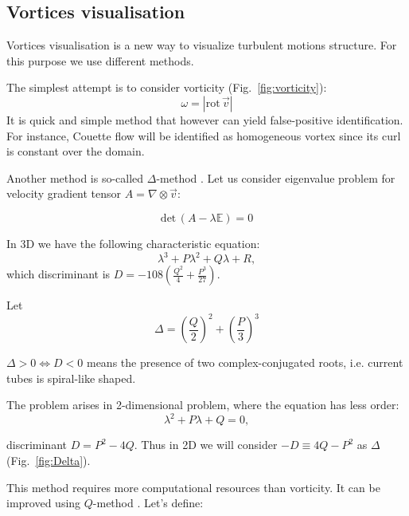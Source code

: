 \documentclass[a4wide,fontsize=12pt]{article}
\begin{document}
\subsection{Vortices visualisation}

Vortices visualisation is a new way to visualize turbulent motions structure. For this purpose we use different methods.

The simplest attempt is to consider vorticity \cite{vortex} (Fig.~\ref{fig:vorticity}): $$\omega=|\textrm{rot}\,\vec{v}|$$
It is quick and simple method that however can yield false-positive identification. For instance, Couette flow will be identified as homogeneous vortex since its curl is constant over the domain.

Another method is so-called $\Delta$-method \cite{vortex}. Let us consider eigenvalue problem for velocity gradient tensor $A=\nabla\otimes  \vec v$:


\begin{equation}
  \text{det} \,( A -\lambda \mathbb E)=0
\end{equation}  

In 3D we have the following characteristic equation: $$\lambda^3+P\lambda^2+Q\lambda+R,$$ \noindent which discriminant is $D=-108\left( \frac{Q^2}{4} +\frac{P^3}{27}\right)$. 


Let $$\Delta=\left(\frac{Q}{2}\right)^2 +\left(\frac{P}{3}\right)^3$$

$ \Delta > 0  \Leftrightarrow  D < 0$ means the presence of two complex-conjugated roots, i.e. current tubes is spiral-like shaped.

The problem arises in 2-dimensional problem, where the equation has less order:
$$\lambda^2+P\lambda+Q=0,$$

discriminant $D=P^2-4Q$. Thus in 2D we will consider $-D\equiv 4Q-P^2$ as $\Delta$ (Fig.~\ref{fig:Delta}).

This method requires more computational resources than vorticity. It can be improved using $Q$-method \cite{vortex}\cite{Hussain}. Let's define:
\end{document}
